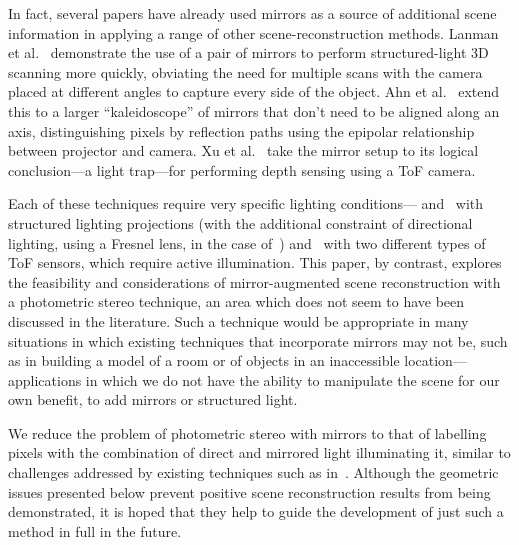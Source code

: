 In fact, several papers have already used mirrors as a source of additional
scene information in applying a range of other scene-reconstruction methods.
Lanman et al.~\cite{lanman} demonstrate the use of a pair of mirrors to perform
structured-light 3D scanning more quickly, obviating the need for multiple
scans with the camera placed at different angles to capture every side of the
object. Ahn et al.~\cite{ahn} extend this to a larger ``kaleidoscope'' of
mirrors that don't need to be aligned along an axis, distinguishing pixels by
reflection paths using the epipolar relationship between projector and camera.
Xu et al.~\cite{xu} take the mirror setup to its logical conclusion---a light
trap---for performing depth sensing using a ToF camera.

Each of these techniques require very specific lighting
conditions---\cite{lanman} and~\cite{ahn} with structured lighting projections
(with the additional constraint of directional lighting, using a Fresnel lens,
in the case of~\cite{lanman}) and~\cite{xu} with two different types of ToF
sensors, which require active illumination. This paper, by contrast, explores
the feasibility and considerations of mirror-augmented scene reconstruction
with a photometric stereo technique, an area which does not seem to have been
discussed in the literature. Such a technique would be appropriate in many
situations in which existing techniques that incorporate mirrors may not be,
such as in building a model of a room or of objects in an inaccessible
location---applications in which we do not have the ability to manipulate the
scene for our own benefit, to add mirrors or structured light.

We reduce the problem of photometric stereo with mirrors to that of labelling
pixels with the combination of direct and mirrored light illuminating it,
similar to challenges addressed by existing techniques such as
in~\cite{schechner}. Although the geometric issues presented below prevent
positive scene reconstruction results from being demonstrated, it is hoped that
they help to guide the development of just such a method in full in the future.

